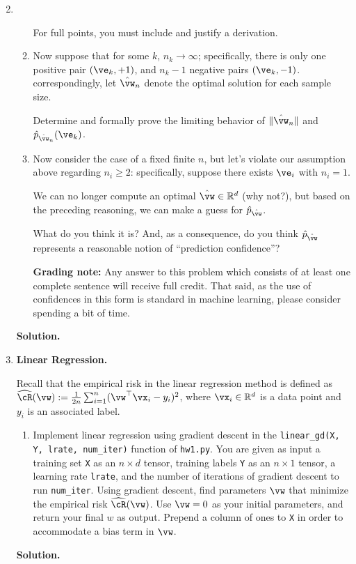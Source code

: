 \documentclass{article}
\def\R{\mathbb{R}}
\def\hcR{\widehat{\cR}}
\newcommand{\pww}[1]{\hat p_{#1}}
\theoremstyle{definition}
\theoremstyle{remark}
\newenvironment{Q}
{%
  \clearpage
  \item
  }
  {%
    \phantom{s} %
    \bigskip
    \textbf{Solution.}
  }
\begin{document}
\begin{enumerate}[font={\Large\bfseries},left=0pt]
\begin{Q}
\begin{enumerate}
  For full points, you must include and justify a derivation.

\item
  Now suppose that for some $k$, $n_k\to\infty$; specifically,
  there is only one positive pair $(\ve_k,+1)$, and $n_k-1$ negative pairs $(\ve_k,-1)$.
  correspondingly, let $\hat\vw_n$ denote the optimal solution for each sample size.

  Determine and formally prove the limiting behavior of $\|\hat \vw_n\|$
  and $\pww{\hat \vw_n}(\ve_k)$.

\item
  Now consider the case of a fixed finite $n$, but let's violate our assumption above
  regarding $n_i\geq 2$: specifically, suppose there exists $\ve_i$ with $n_i = 1$.

  We can no longer compute an optimal $\hat \vw\in\R^d$ (why not?),
  but based on the preceding reasoning, we can make a guess for $\pww{\hat \vw}$.

  What do you think it is?  And, as a consequence, do you think
  $\pww{\hat \vw}$ represents a reasonable notion of ``prediction confidence''?

  \textbf{Grading note:} Any answer to this problem which consists of at least one
  complete sentence will receive full credit.
  That said, as the use of confidences in this form is standard in machine learning,
  please consider spending a bit of time.

\end{enumerate}
\end{Q}


    \begin{Q}
      \textbf{\Large Linear Regression.}

      Recall that the empirical risk in the linear regression method is defined as $\hcR(\vw) := \frac{1}{2n}\sum_{i=1}^n (\vw^\top \vx_i - y_i)^2$, where $\vx_i \in \R^d$ is a data point and $y_i$ is an associated label.
      \begin{enumerate}
        \item Implement linear regression using gradient descent in the \texttt{linear\_gd(X, Y, lrate, num\_iter)} function of \texttt{hw1.py}. You are given as input a training set \texttt{X} as an $n \times d$ tensor, training labels \texttt{Y} as an $n \times 1$ tensor, a learning rate \texttt{lrate}, and the number of iterations of gradient descent to run \texttt{num\_iter}.  Using gradient descent, find parameters $\vw$ that minimize the empirical risk $\hcR(\vw)$. Use $\vw = 0$ as your initial parameters, and return your final $w$ as output. Prepend a column of ones to \texttt{X} in order to accommodate a bias term in $\vw$.


\end{enumerate}
\end{Q}
\end{enumerate}
\end{document}
